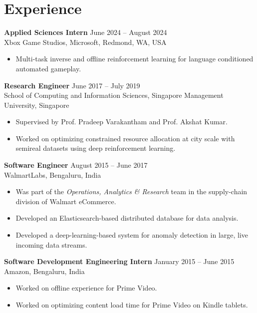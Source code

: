 \documentclass[letterpaper,11pt]{article}
\begin{document}
\section*{Experience}
\textbf{Applied Sciences Intern} \hfill June 2024 -- August 2024\\
Xbox Game Studios, Microsoft, Redmond, WA, USA
\vspace{-1em}
\begin{itemize}
    \setlength\itemsep{0em}
  \item Multi-task inverse and offline reinforcement learning for language conditioned automated gameplay.
\end{itemize}
\vspace{-0.5em}
\textbf{Research Engineer} \hfill June 2017 -- July 2019\\
School of Computing and Information Sciences, Singapore Management University, Singapore
\vspace{-1em}
\begin{itemize}
    \setlength\itemsep{0em}
  \item Supervised by Prof. Pradeep Varakantham and Prof. Akshat Kumar.
  \item Worked on optimizing constrained resource allocation at city scale with semireal datasets using deep reinforcement learning.
\end{itemize}
\vspace{-0.5em}
\textbf{Software Engineer} \hfill August 2015 -- June 2017\\
WalmartLabs, Bengaluru, India
\vspace{-1em}
\begin{itemize}
    \setlength\itemsep{0em}
  \item Was part of the \emph{Operations, Analytics \& Research} team in the supply-chain division of Walmart eCommerce.
  \item Developed an Elasticsearch-based distributed database for data analysis.
  \item Developed a deep-learning-based system for anomaly detection in large, live incoming data streams.
\end{itemize}
\vspace{-0.5em}
\textbf{Software Development Engineering Intern} \hfill January 2015 -- June 2015\\
Amazon, Bengaluru, India
\vspace{-1em}
\begin{itemize}
    \setlength\itemsep{0em}
  \item Worked on offline experience for Prime Video.
  \item Worked on optimizing content load time for Prime Video on Kindle tablets.
\end{itemize}
\end{document}
